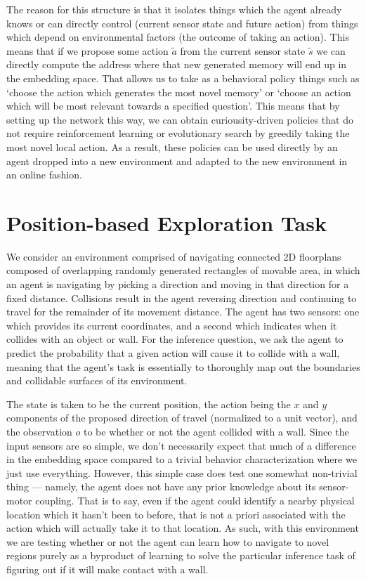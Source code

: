 \documentclass[letterpaper]{article}
\begin{document}
The reason for this structure is that it isolates things which the agent already knows or can directly control (current sensor state and future action) from things which depend on environmental factors (the outcome of taking an action). This means that if we propose some action $\tilde{a}$ from the current sensor state $\tilde{s}$ we can directly compute the address where that new generated memory will end up in the embedding space. That allows us to take as a behavioral policy things such as `choose the action which generates the most novel memory' or `choose an action which will be most relevant towards a specified question'. This means that by setting up the network this way, we can obtain curiousity-driven policies that do not require reinforcement learning or evolutionary search by greedily taking the most novel local action. As a result, these policies can be used directly by an agent dropped into a new environment and adapted to the new environment in an online fashion.

\section{Position-based Exploration Task}

We consider an environment comprised of navigating connected 2D floorplans composed of overlapping randomly generated rectangles of movable area, in which an agent is navigating by picking a direction and moving in that direction for a fixed distance. Collisions result in the agent reversing direction and continuing to travel for the remainder of its movement distance. The agent has two sensors: one which provides its current coordinates, and a second which indicates when it collides with an object or wall. For the inference question, we ask the agent to predict the probability that a given action will cause it to collide with a wall, meaning that the agent's task is essentially to thoroughly map out the boundaries and collidable surfaces of its environment.

The state is taken to be the current position, the action being the $x$ and $y$ components of the proposed direction of travel (normalized to a unit vector), and the observation $o$ to be whether or not the agent collided with a wall. Since the input sensors are so simple, we don't necessarily expect that much of a difference in the embedding space compared to a trivial behavior characterization where we just use everything. However, this simple case does test one somewhat non-trivial thing --- namely, the agent does not have any prior knowledge about its sensor-motor coupling. That is to say, even if the agent could identify a nearby physical location which it hasn't been to before, that is not a priori associated with the action which will actually take it to that location. As such, with this environment we are testing whether or not the agent can learn how to navigate to novel regions purely as a byproduct of learning to solve the particular inference task of figuring out if it will make contact with a wall.
\end{document}
